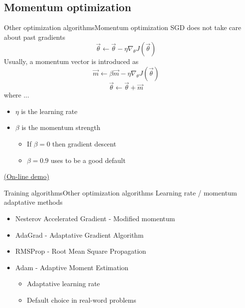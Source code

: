 \documentclass[10pt,compress]{beamer} %
\begin{document}
\subsection{Momentum optimization}

\begin{frame}{Other optimization algorithms}{Momentum optimization}
    SGD does not take care about past gradients
	\begin{equation*}
		\vec{\theta} \leftarrow \vec{\theta} - \eta \nabla_{\theta} J(\vec{\theta})
	\end{equation*}
    Usually, a \alert{momentum} vector is introduced as
	\begin{equation*}
		\vec{m} \leftarrow \beta \vec{m} - \eta \nabla_\theta J(\vec{\theta})
        \end{equation*}
	\begin{equation*}
		\vec{\theta} \leftarrow \vec{\theta} + \vec{m}
        \end{equation*}
    where ...
    \begin{itemize}
	\item $\eta$ is the learning rate
	\item $\beta$ is the momentum strength
		\begin{itemize}
        		\item If $\beta = 0$ then gradient descent
			\item $\beta=0.9$ uses to be a good default
		\end{itemize}
    \end{itemize}

    \href{http://distill.pub/2017/momentum/}{(On-line demo)}
\end{frame}

\begin{frame}{Training algorithms}{Other optimization algorithms}
	Learning rate / momentum  adaptative methods
	\begin{itemize}
		\item Nesterov Accelerated Gradient - Modified momentum
		\item AdaGrad - Adaptative Gradient Algorithm
		\item RMSProp - Root Mean Square Propagation
		\item Adam - Adaptive Moment Estimation
			\begin{itemize}
				\item Adaptative learning rate
				\item Default choice in real-word problems
			\end{itemize}
	\end{itemize}
\end{frame}
\end{document}
